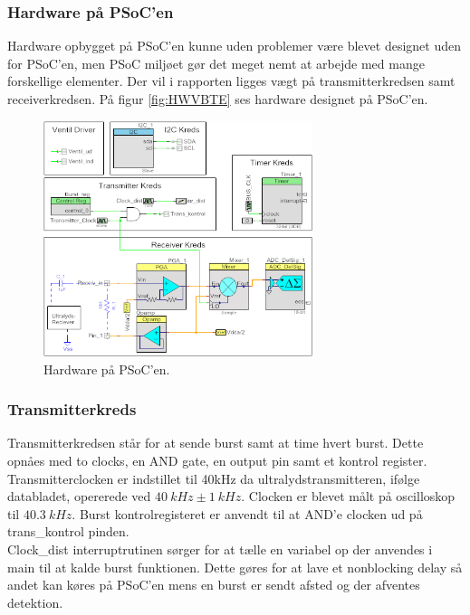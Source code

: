 \subsubsection{Hardware på PSoC'en}
Hardware opbygget på PSoC'en kunne uden problemer være blevet designet uden for PSoC'en, men PSoC miljøet gør det meget nemt at arbejde med mange forskellige elementer. Der vil i rapporten ligges vægt på transmitterkredsen samt receiverkredsen. På figur \ref{fig:HWVBTE} ses hardware designet på PSoC'en.
\begin{figure}[H]
\centering
\includegraphics[width=0.7\textwidth]{billeder/PSOC_Hardware}
\caption{Hardware på PSoC'en.}
\label{fig:PSOCHW}
\end{figure}
\subsubsection{Transmitterkreds}
Transmitterkredsen står for at sende burst samt at time hvert burst.  Dette opnåes med to clocks, en AND gate, en output pin samt et kontrol register. Transmitterclocken er indstillet til 40kHz da ultralydstransmitteren, ifølge databladet, opererede ved $\SI{40}{kHz}\pm\SI{1}{kHz}$. Clocken er blevet målt på oscilloskop til $\SI{40.3}{kHz}$. Burst kontrolregisteret er anvendt til at AND'e clocken ud på trans\_kontrol pinden.\\
Clock\_dist interruptrutinen sørger for at tælle en variabel op der anvendes i main til at kalde burst funktionen. Dette gøres for at lave et nonblocking delay så andet kan køres på PSoC'en mens en burst er sendt afsted og der afventes detektion.
